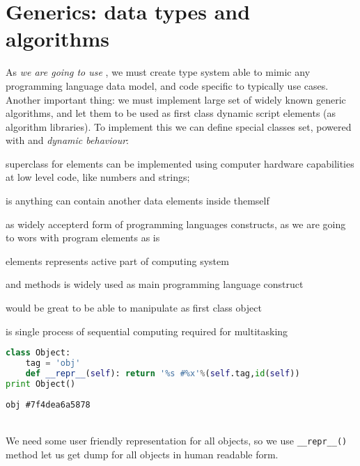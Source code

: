 \chapter{Generics: data types and algorithms}\clearpage

As \emph{we are going to use }, we must create type
system able to mimic any programming language data model, and 
code specific to typically use cases. Another important thing: we must implement
large set of widely known generic algorithms, and let them to be used as
first class dynamic script elements (as algorithm libraries).
To implement this we can define special classes set, powered with
 and \emph{dynamic behaviour}:
\begin{description}[nosep]
\item[Primitive] superclass for elements can be implemented using
computer hardware capabilities at low level code, like numbers and strings;
\item[Collection] is anything can contain another data elements inside themself
\item[AST] as widely accepterd form of programming languages constructs, as
we are going to wors with program elements as is
\item[Active] elements represents active part of computing system
\item[Function] and methods is widely used as main programming language
construct
\item[Algorithm] would be great to be able to manipulate as first class object
\item[Thread] is single process of sequential computing required for
multitasking
\end{description}



\begin{lstlisting}[language=Python]
class Object:
    tag = 'obj'
    def __repr__(self): return '%s #%x'%(self.tag,id(self))
print Object()
\end{lstlisting}
\begin{lstlisting}
obj #7f4dea6a5878
\end{lstlisting}
\\We need some user friendly representation for all objects, so we use
\verb|__repr__()| method let us get dump for all objects in human readable form.


